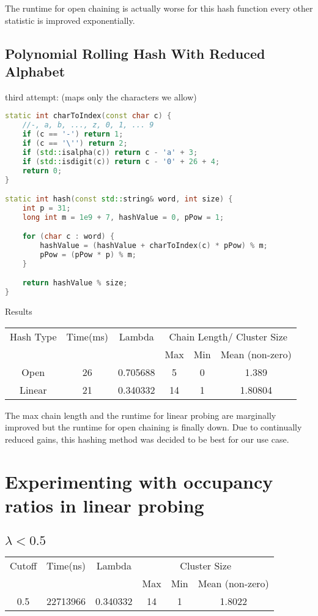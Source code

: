 \documentclass[12pt]{article}
\begin{document}
The runtime for open chaining is actually worse for this hash function every other statistic is improved exponentially.

\subsection{Polynomial Rolling Hash With Reduced Alphabet}

third attempt: (maps only the characters we allow)
\begin{lstlisting}[language=C++]
static int charToIndex(const char c) {
    //-, a, b, ..., z, 0, 1, ... 9
    if (c == '-') return 1;
    if (c == '\'') return 2;
    if (std::isalpha(c)) return c - 'a' + 3;
    if (std::isdigit(c)) return c - '0' + 26 + 4;
    return 0;
}

static int hash(const std::string& word, int size) {
    int p = 31;
    long int m = 1e9 + 7, hashValue = 0, pPow = 1;

    for (char c : word) {
        hashValue = (hashValue + charToIndex(c) * pPow) % m;
        pPow = (pPow * p) % m;
    }

    return hashValue % size;
}
\end{lstlisting}

\begin{center}
Results\\
\begin{tabular}{|c|c|c|c|c|c|}
\hline
Hash Type & Time(ms) & Lambda & \multicolumn{3}{|c|}{Chain Length/ Cluster Size} \\
 & & & Max & Min & Mean (non-zero) \\
\hline
Open & 26 & 0.705688 & 5 & 0 & 1.389\\
Linear & 21 & 0.340332 & 14 & 1 & 1.80804\\
\hline
\end{tabular}
\end{center}

The max chain length and the runtime for linear probing are marginally improved but the runtime for open chaining is finally down. Due to continually reduced gains, this hashing method was decided to be best for our use case.

\section{Experimenting with occupancy ratios in linear probing}
\subsection{$\lambda < 0.5$}
\begin{center}
\begin{tabular}{|c|c|c|c|c|c|}
\hline
Cutoff & Time(ns) & Lambda & \multicolumn{3}{|c|}{Cluster Size} \\
 & & & Max & Min & Mean (non-zero) \\
\hline
0.5 & 22713966 & 0.340332 & 14 & 1 & 1.8022 \\
\hline
\end{tabular}
\end{center}
\end{document}
